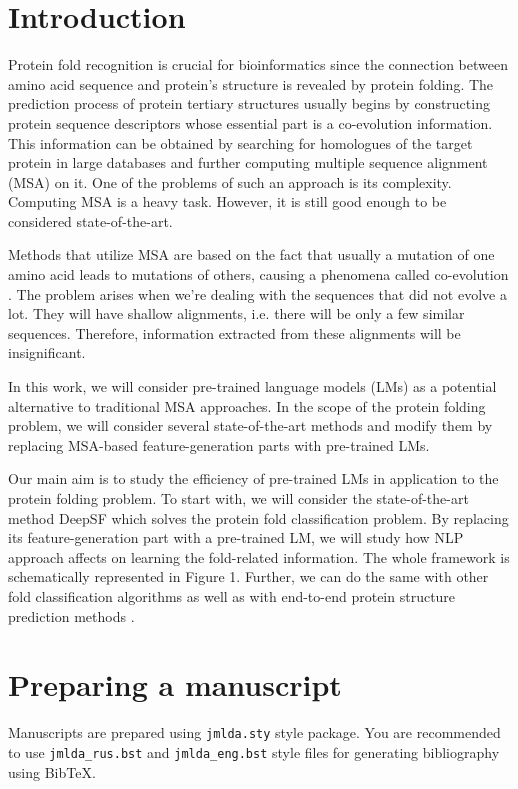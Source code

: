 \documentclass[12pt, twoside]{article}
\begin{document}
\section{Introduction}
\noindent %
Protein fold recognition is crucial for bioinformatics since the connection between amino acid sequence and protein’s structure is revealed by protein folding. The prediction process of protein tertiary structures usually begins by constructing protein sequence descriptors whose essential part is a co-evolution information. This information can be obtained by searching for homologues of the target protein in large databases and further computing multiple sequence alignment (MSA) on it. One of the problems of such an approach is its complexity. Computing MSA is a heavy task. However, it is still good enough to be considered state-of-the-art.

Methods that utilize MSA are based on the fact that usually a mutation of one amino acid leads to mutations of others, causing a phenomena called co-evolution \cite{co-evolution}. The problem arises when we’re dealing with the sequences that did not evolve a lot. They will have shallow alignments, i.e. there will be only a few similar sequences. Therefore, information extracted from these alignments will be insignificant. 

In this work, we will consider pre-trained language models (LMs) \cite{Elnaggar} as a potential alternative to traditional MSA approaches.  In the scope of the protein folding problem, we will  consider  several  state-of-the-art  methods  and  modify  them  by  replacing  MSA-based feature-generation parts with pre-trained LMs.

Our main aim is to study the efficiency of pre-trained LMs in application to the protein folding problem.  To start with, we will consider the state-of-the-art method DeepSF \cite{DeepSF} which solves the protein fold classification problem.  By replacing its feature-generation part with a pre-trained LM, we will study how NLP approach affects on learning the fold-related information.  The whole framework is schematically represented in Figure 1. Further, we can do the same with other fold classification algorithms\cite{Villegas, DeepFrag} as well as with end-to-end protein structure prediction methods \cite{Kandathil, Xu2020.10.12.336859}.


\section{Preparing a manuscript}
\noindent
Manuscripts are prepared using \verb'jmlda.sty' style package.
You are recommended to use \verb'jmlda_rus.bst' and \verb'jmlda_eng.bst' style files for generating bibliography using Bib\TeX.
\end{document}
